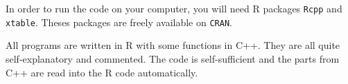 \documentclass[a4paper,12pt]{article}
\begin{document}
In order to run the code on your computer, you will need R packages \verb|Rcpp| and \verb|xtable|. Theses packages are freely available on \verb|CRAN|.
\vspace{0.2cm}

All programs are written in R with some functions in C++. They are all quite self-explanatory and commented. The code is self-sufficient and the parts from C++ are read into the R code automatically. 
\end{document}

